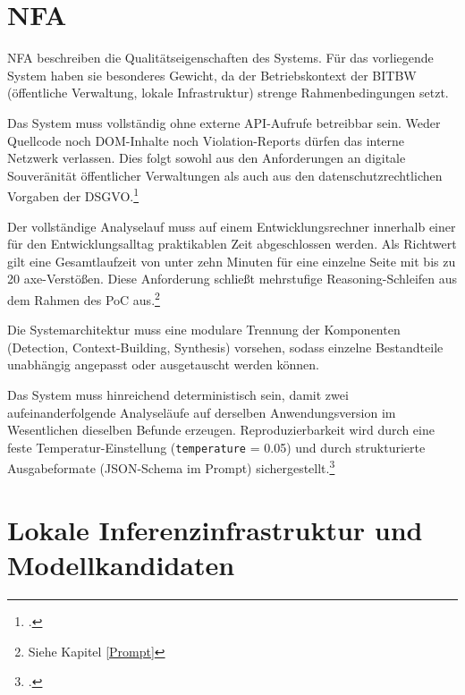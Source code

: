 \section{\acl{NFA}}\label{kap:4.3}

\acf{NFA} beschreiben die Qualitätseigenschaften des Systems. Für das vorliegende System haben sie besonderes Gewicht, da der Betriebskontext der \ac{BITBW} (öffentliche Verwaltung, lokale Infrastruktur) strenge Rahmenbedingungen setzt.


Das System muss vollständig ohne externe \ac{API}-Aufrufe betreibbar sein. Weder Quellcode noch \ac{DOM}-Inhalte noch Violation-Reports dürfen das interne Netzwerk verlassen. Dies folgt sowohl aus den Anforderungen an digitale Souveränität öffentlicher Verwaltungen als auch aus den datenschutzrechtlichen Vorgaben der \ac{DSGVO}.\footcites[Vgl.][]{bmds_digitale_souveraenitaet}[][Art. 28 und Art. 32]{dsgvo2016}


Der vollständige Analyselauf muss auf einem Entwicklungsrechner innerhalb einer für den Entwicklungsalltag praktikablen Zeit abgeschlossen werden. Als Richtwert gilt eine Gesamtlaufzeit von unter zehn Minuten für eine einzelne Seite mit bis zu 20 axe-Verstößen. Diese Anforderung schließt mehrstufige Reasoning-Schleifen aus dem Rahmen des \ac{PoC} aus.\footnote{Siehe Kapitel \ref{Prompt}}


Die Systemarchitektur muss eine modulare Trennung der Komponenten (Detection, Context-Building, Synthesis) vorsehen, sodass einzelne Bestandteile unabhängig angepasst oder ausgetauscht werden können.


Das System muss hinreichend deterministisch sein, damit zwei aufeinanderfolgende Analyseläufe auf derselben Anwendungsversion im Wesentlichen dieselben Befunde erzeugen. Reproduzierbarkeit wird durch eine feste Temperatur-Einstellung (\texttt{temperature} = 0.05) und durch strukturierte Ausgabeformate (\acs{JSON}-Schema im Prompt) sichergestellt.\footcites[Vgl.][Temperature]{OpenAI_Developers}[][Temperature]{anthropic2026claude}

\section{Lokale Inferenzinfrastruktur und Modellkandidaten}\label{kap:4.4}

